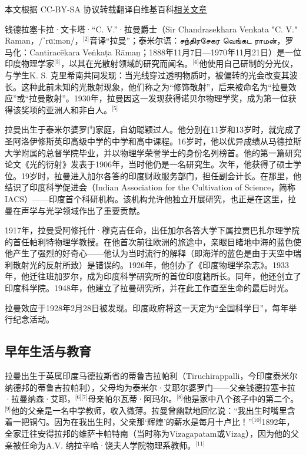 
本文根据 CC-BY-SA 协议转载翻译自维基百科\href{https://en.wikipedia.org/wiki/C._V._Raman}{相关文章}

钱德拉塞卡拉·文卡塔·“C. V.”·拉曼爵士（Sir Chandrasekhara Venkata "C. V." Raman，/ˈrɑːmən/，\(^\text{[2]}\)音译“拉曼”；泰米尔语：சந்திரசேகர வெங்கட ராமன்，罗马化：Cantiracēkara Veṅkaṭa Rāmaṉ；1888年11月7日—1970年11月21日）是一位印度物理学家\(^\text{[3]}\)，以其在光散射领域的研究而闻名。\(^\text{[4]}\)他使用自己研制的分光仪，与学生K. S. 克里希南共同发现：当光线穿过透明物质时，被偏转的光会改变其波长。这种此前未知的光散射现象，他们称之为“修饰散射”，后来被命名为“拉曼效应”或“拉曼散射”。1930年，拉曼因这一发现获得诺贝尔物理学奖，成为第一位获得该奖项的亚洲人和非白人。\(^\text{[5]}\)

拉曼出生于泰米尔婆罗门家庭，自幼聪颖过人。他分别在11岁和13岁时，就完成了圣阿洛伊修斯英印高级中学的中学和高中课程。16岁时，他以优异成绩从马德拉斯大学附属的总督学院毕业，并以物理学荣誉学士的身份名列榜首。他的第一篇研究论文《光的衍射》发表于1906年，当时他仍是一名研究生。次年，他获得了硕士学位。19岁时，拉曼进入加尔各答的印度财政服务部门，担任副会计长。在那里，他结识了印度科学促进会（Indian Association for the Cultivation of Science，简称 IACS）——印度首个科研机构。该机构允许他独立开展研究，也正是在这里，拉曼在声学与光学领域作出了重要贡献。

1917年，拉曼受阿修托什·穆克吉任命，出任加尔各答大学下属拉贾巴扎尔理学院的首任帕利特物理学教授。在他首次前往欧洲的旅途中，亲眼目睹地中海的蓝色使他产生了强烈的好奇心——他认为当时流行的解释（即海洋的蓝色是由于天空中瑞利散射光的反射所致）是错误的。1926年，他创办了《印度物理学杂志》。1933年，他迁往班加罗尔，成为印度科学研究所的首位印度籍所长。同年，他还创立了印度科学院。1948年，他建立了拉曼研究所，并在此工作直至生命的最后时光。

拉曼效应于1928年2月28日被发现。印度政府将这一天定为“全国科学日”，每年举行纪念活动。
\subsection{早年生活与教育}
拉曼出生于英属印度马德拉斯省的蒂鲁吉拉帕利（Tiruchirappalli，今印度泰米尔纳德邦的蒂鲁吉拉帕利），父母均为泰米尔·艾耶尔婆罗门——父亲钱德拉塞卡拉·拉曼纳森·艾耶，\(^\text{[6][7]}\)母亲帕尔瓦蒂·阿玛尔。\(^\text{[8]}\)他是家中八个孩子中的第二个。\(^\text{[9]}\)他的父亲是一名中学教师，收入微薄。拉曼曾幽默地回忆说：“我出生时嘴里含着一把铜勺。因为在我出生时，父亲那‘辉煌’的薪水是每月十卢比！”\(^\text{[10]}\)1892年，全家迁往安得拉邦的维萨卡帕特南（当时称为Vizagapatam或Vizag），因为他的父亲被任命为A.V. 纳拉辛哈·饶夫人学院物理系教师。\(^\text{[11]}\)

